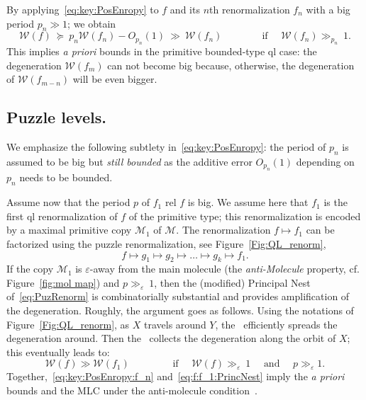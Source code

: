\documentclass[twoside,leqno]{article}
\theoremstyle{plain}
\newcommand{\Width}{{\mathcal W}}
\newcommand\MM{{\mathcal{M}}}
\begin{document}
By applying~\eqref{eq:key:PosEnropy} to $f$ and its $n$th renormalization $f_n$ with a big period $p_n\gg 1$; we obtain
\begin{equation}
    \label{eq:key:PosEnropy:f_n} \Width(f)\ \succeq \ p_n\Width(f_n) -O_{p_n}(1)\ \gg\  \Width(f_n)\qquad\qquad \text{if }\quad \Width(f_n)\gg_{p_n}\ 1.
\end{equation}
This implies \emph{a priori} bounds in the primitive bounded-type ql case: the degeneration $\Width(f_m)$ can not become big because, otherwise, the degeneration of $\Width(f_{m-n})$ will be even bigger. 

\subsection{Puzzle levels.}\label{ss:MLC:puzzle} We emphasize the following subtlety in~\eqref{eq:key:PosEnropy}: the period of $p_n$ is assumed to be big but \emph{still bounded} as the additive error $O_{p_n}(1)$ depending on $p_n$ needs to be bounded.

Assume now that the period $p$ of $f_1$ rel $f$ is big. We assume here that $f_1$ is the first ql renormalization of $f$ of the primitive type; this renormalization is encoded by a maximal primitive copy $\MM_1$ of $\MM$. The renormalization $f\mapsto f_1$ can be factorized using the puzzle renormalization, see Figure~\ref{Fig:QL_renorm}, 
\begin{equation}
\label{eq:PuzRenorm}
  f\mapsto g_1\mapsto g_2\mapsto \dots \mapsto g_k \mapsto f_1.
\end{equation}
If the copy $\MM_1$ is $\varepsilon$-away from the main molecule (the \emph{anti-Molecule} property, cf. Figure~\ref{fig:mol map}) and $p\gg_\varepsilon \ 1$, then the (modified) Principal Nest of~\eqref{eq:PuzRenorm} is combinatorially substantial and provides amplification of the degeneration. Roughly, the argument goes as follows. Using the notations of Figure~\ref{Fig:QL_renorm}, as $X$ travels around $Y$, the~\cite[Covering Lemma]{KL09} efficiently spreads the degeneration around. Then the~\cite[Quasi-Additivity Law]{KL09} collects the degeneration along the orbit of $X$; this eventually leads to:
\begin{equation}
    \label{eq:f:f_1:PrincNest} \Width(f) \gg \Width (f_1)\qquad\qquad \text{ if }\quad \Width(f)\gg_\varepsilon\ 1\quad \text{ and }\quad  p\gg_\varepsilon 1.
\end{equation}
Together,~\eqref{eq:key:PosEnropy:f_n} and~\eqref{eq:f:f_1:PrincNest} imply the \emph{a priori} bounds and the MLC under the anti-molecule condition~\cite{KL2,KL3}.
\end{document}
